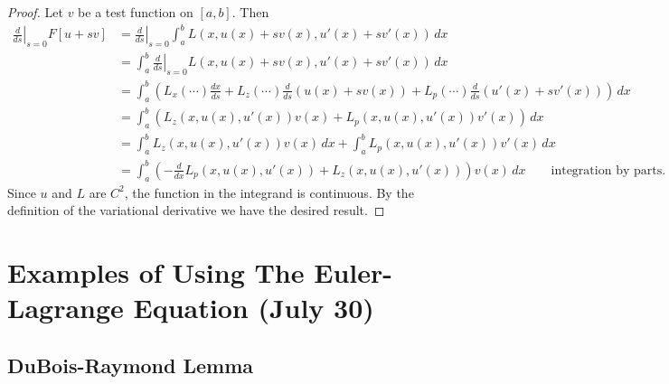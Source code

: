 \documentclass[11pt]{article}
\begin{document}
\begin{proof}
Let $v$ be a test function on $[a,b]$. Then
\begin{align*}
\left. \frac{d}{ds} \right|_{s=0} F[u + sv] &= \left. \frac{d}{ds} \right|_{s=0} \int_a^b L(x, u(x) + sv(x), u'(x) + sv'(x)) \, dx \\
&=  \int_a^b \left. \frac{d}{ds} \right|_{s=0} L(x, u(x) + sv(x), u'(x) + sv'(x)) \, dx \\
&= \int_a^b \left( L_x(\cdots) \frac{dx}{ds} + L_z(\cdots)\frac{d}{ds}(u(x) + sv(x)) + L_p(\cdots)\frac{d}{ds}(u'(x) + sv'(x)) \right) \, dx \\
&= \int_a^b \left( L_z(x,u(x),u'(x))v(x) + L_p(x,u(x),u'(x))v'(x) \right)\, dx \\
&= \int_a^b L_z(x,u(x),u'(x))v(x) \, dx + \int_a^b L_p(x,u(x),u'(x))v'(x) \, dx \\
&= \int_a^b \left( -\frac{d}{dx} L_p(x,u(x),u'(x)) + L_z(x,u(x),u'(x)) \right) v(x) \, dx \qquad \text{integration by parts.}
\end{align*}
Since $u$ and $L$ are $C^2$, the function in the integrand is continuous. By the definition of the variational derivative we have the desired result.
\end{proof}

\newpage

\section{Examples of Using The Euler-Lagrange Equation (July 30)}

\subsection{DuBois-Raymond Lemma}
\end{document}
